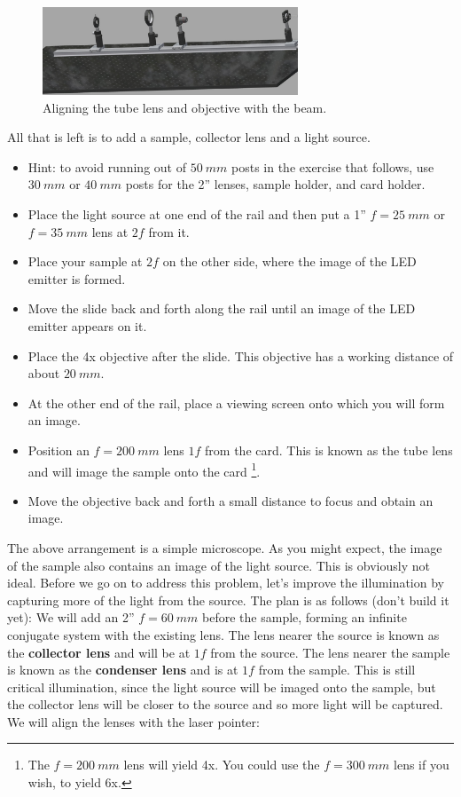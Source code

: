 \documentclass[a4paper]{report}
\begin{document}
\begin{figure}[h]
\center
\includegraphics[width=3in]{Obj_alignment_before.eps}
\caption{Aligning the tube lens and objective with the beam.}
\label{fig:beam_obj_tube}
\end{figure}

All that is left is to add a sample, collector lens and a light source. 

\begin{itemize}
\item Hint: to avoid running out of $50~mm$ posts in the exercise that follows, use $30~mm$ or $40~mm$ posts for the 2'' lenses, sample holder, and card holder.
\item Place the light source at one end of the rail and then put a 1''{\diameter} $f=25~mm$ or $f=35~mm$ lens at $2f$ from it.
\item Place your sample at $2f$ on the other side, where the image of the LED emitter is formed.
\item Move the slide back and forth along the rail until an image of the LED emitter appears on it.
\item Place the 4x objective after the slide. This objective has a working distance of about $20~mm$.
\item At the other end of the rail, place a viewing screen onto which you will form an image.
\item Position an $f=200~mm$ lens $1f$ from the card. This is known as the tube lens and will image the sample onto the card
\footnote{The $f=200~mm$ lens will yield 4x. You could use the $f=300~mm$ lens if you wish, to yield 6x.}.
\item Move the objective back and forth a small distance to focus and obtain an image. 
\end{itemize}

The above arrangement is a simple microscope. 
As you might expect, the image of the sample also contains an image of the light source. 
This is obviously not ideal.
Before we go on to address this problem, let's improve the illumination by capturing more of the light from the source. 
The plan is as follows (don't build it yet):
We will add an 2''{\diameter} $f=60~mm$ before the sample, forming an infinite conjugate system with the existing lens. 
The lens nearer the source is known as the \textbf{collector lens} and will be at $1f$ from the source.
The lens nearer the sample is known as the \textbf{condenser lens} and is at $1f$ from the sample. 
This is still critical illumination, since the light source will be imaged onto the sample, but the collector lens will be closer to the source and so more light will be captured. We will align the lenses with the laser pointer:
\end{document}
